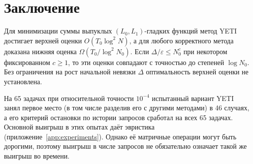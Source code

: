 \section{Заключение}\label{sec:conclusion}
Для минимизации суммы выпуклых $(L_0,L_1)$-гладких функций метод YETI
достигает верхней оценки $O(T_0\log^2N)$, а для любого корректного метода
доказана нижняя оценка $\Omega(T_0/\log^2N_0)$. Если $\Delta/\varepsilon\le N_0^c$
при некотором фиксированном $c\ge1$, то эти оценки совпадают с точностью
до степеней $\log N_0$. Без ограничения на рост начальной невязки $\Delta$
оптимальность верхней оценки не установлена.

На 65 задачах при относительной точности $10^{-4}$ испытанный вариант YETI
занял первое место (в том числе разделив его с другими методами)
в 46 случаях, а его критерий остановки по истории запросов сработал
на всех 65 задачах. Основной выигрыш в этих опытах даёт эвристика
(приложение~\ref{app:experiments}). Однако её матричные операции могут
быть дорогими, поэтому выигрыш в числе запросов не обязательно означает
такой же выигрыш во времени.

